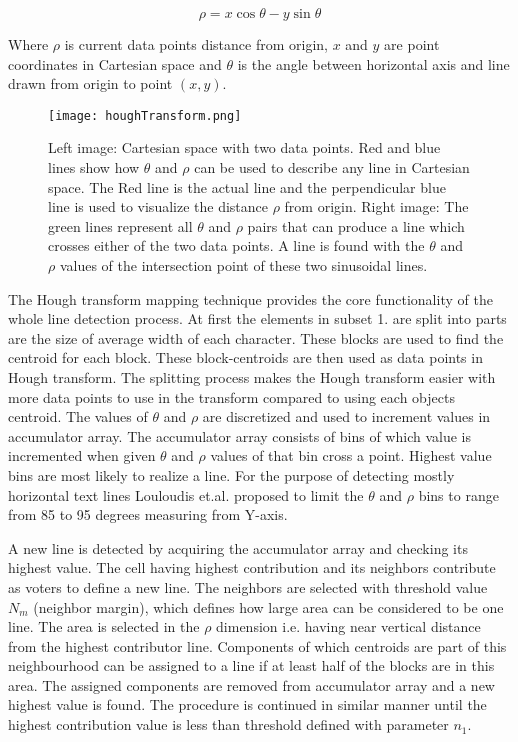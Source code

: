 \documentclass{article}
\begin{document}
            \begin{equation}
              \rho = x \cos \theta - y \sin \theta
            \end{equation}

            Where $\rho$ is current data points distance from origin, $x$ and $y$ are point coordinates in Cartesian space and $\theta$ is the angle between horizontal axis and line drawn from origin to point $(x,y)$.

            \begin{figure}[!ht]
              \centering
              \texttt{[image: houghTransform.png]}
              \caption{ Left image: Cartesian space with two data points. Red and blue lines show how $\theta$ and $\rho$ can be used to describe any line in Cartesian space. The Red line is the actual line and the perpendicular blue line is used to visualize the distance $\rho$ from origin. Right image: The green lines represent all $\theta$ and $\rho$ pairs that can produce a line which crosses either of the two data points. A line is found with the $\theta$ and $\rho$ values of the intersection point of these two sinusoidal lines. \label{fig:houghtransform}}
            \end{figure}

            The Hough transform mapping technique provides the core functionality of the whole line detection process. At first the elements in subset 1. are split into parts are the size of average width of each character. These blocks are used to find the centroid for each block. These block-centroids are then used as data points in Hough transform. The splitting process makes the Hough transform easier with more data points to use in the transform compared to using each objects centroid. The values of $\theta$ and $\rho$ are discretized and used to increment values in accumulator array. The accumulator array consists of bins of which value is incremented when given $\theta$ and $\rho$ values of that bin cross a point. Highest value bins are most likely to realize a line. For the purpose of detecting mostly horizontal text lines Louloudis et.al. proposed to limit the $\theta$ and $\rho$ bins to range from 85 to 95 degrees measuring from Y-axis.

            A new line is detected by acquiring the accumulator array and checking its highest value. The cell having highest contribution and its neighbors contribute as voters to define a new line. The neighbors are selected with threshold value $N_m$ (neighbor margin), which defines how large area can be considered to be one line. The area is selected in the $\rho$ dimension i.e. having near vertical distance from the highest contributor line. Components of which centroids are part of this neighbourhood can be assigned to a line if at least half of the blocks are in this area. The assigned components are removed from accumulator array and a new highest value is found. The procedure is continued in similar manner until the highest contribution value is less than threshold defined with parameter $n_1$.
\end{document}
